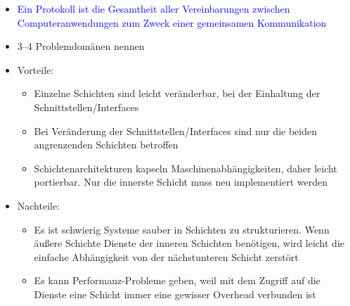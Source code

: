 \begin{itemize}
    \item \textcolor{blue}{Ein Protokoll ist die Gesamtheit aller Vereinbarungen zwischen Computeranwendungen zum Zweck einer gemeinsamen Kommunikation}
\end{itemize}

\begin{itemize}
    \item {} 3–4 Problemdomänen nennen
\end{itemize}

\begin{itemize}
    \item Vorteile:
    \begin{itemize}
        \item Einzelne Schichten sind leicht veränderbar, bei der Einhaltung der Schnittstellen/Interfaces
        \item Bei Veränderung der Schnittstellen/Interfaces sind nur die beiden angrenzenden Schichten betroffen
        \item Schichtenarchitekturen kapseln Maschinenabhängigkeiten, daher leicht portierbar.
        Nur die innerste Schicht muss neu implementiert werden
    \end{itemize}
    \item Nachteile:
    \begin{itemize}
        \item Es ist schwierig Systeme sauber in Schichten zu strukturieren.
        Wenn äußere Schichte Dienste der inneren Schichten benötigen, wird leicht die einfache Abhängigkeit von der nächstunteren Schicht zerstört
        \item Es kann Performanz-Probleme geben, weil mit dem Zugriff auf die Dienste eine Schicht immer eine gewisser Overhead verbunden ist
    \end{itemize}
\end{itemize}

